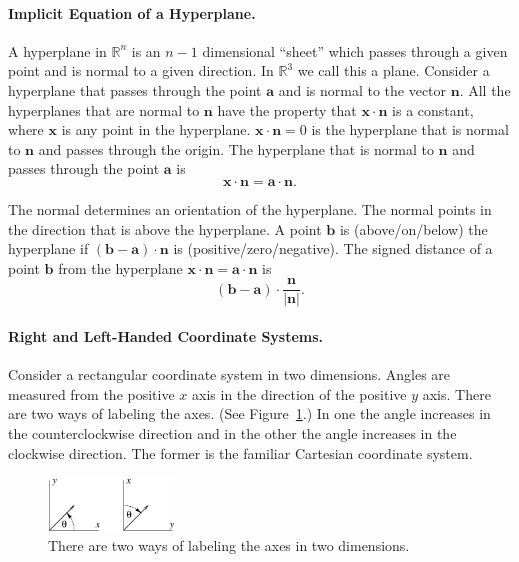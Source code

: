 \paragraph{Implicit Equation of a Hyperplane.}
A hyperplane in $\mathbb{R}^n$ is an $n-1$ dimensional ``sheet'' 
which passes through a given point and is normal to a given direction.
In $\mathbb{R}^3$ we call this a plane.
Consider a hyperplane that passes through the point $\mathbf{a}$ and is normal
to the vector $\mathbf{n}$.  All the hyperplanes that are normal
to $\mathbf{n}$ have the property that $\mathbf{x} \cdot \mathbf{n}$ is a constant, 
where $\mathbf{x}$ is any point in the hyperplane.  
$\mathbf{x} \cdot \mathbf{n} = 0$ is the hyperplane that is normal to $\mathbf{n}$
and passes through the origin.  The hyperplane that is normal to $\mathbf{n}$
and passes through the point $\mathbf{a}$ is
\[
\mathbf{x} \cdot \mathbf{n} = \mathbf{a} \cdot \mathbf{n}.
\]


The normal determines an orientation of the hyperplane.  The normal 
points in the direction that is above the hyperplane.  A point $\mathbf{b}$ is 
(above/on/below) the hyperplane if $(\mathbf{b} - \mathbf{a}) \cdot \mathbf{n}$ is 
(positive/zero/negative).  The signed distance of a point $\mathbf{b}$
from the hyperplane $ \mathbf{x} \cdot \mathbf{n} = \mathbf{a} \cdot \mathbf{n}$ is 
\[
(\mathbf{b} - \mathbf{a}) \cdot \frac{\mathbf{n}}{|\mathbf{n}|}.
\]







\paragraph{Right and Left-Handed Coordinate Systems.}
Consider a rectangular coordinate system in two dimensions.  Angles are 
measured from the positive $x$ axis in the direction of the positive $y$
axis.  There are two ways of labeling the axes.  (See Figure~\ref{twodimrl}.)
In one the angle increases in the counterclockwise direction and in the
other the angle increases in the clockwise direction.  The former is the 
familiar Cartesian coordinate system.

\begin{figure}[htb!]
\begin{center}
  \includegraphics[width=0.3\textwidth]{algebra/vectors/twodimrl}
\end{center}
\caption{There are two ways of labeling the axes in two dimensions.}
\label{twodimrl}
\end{figure}

